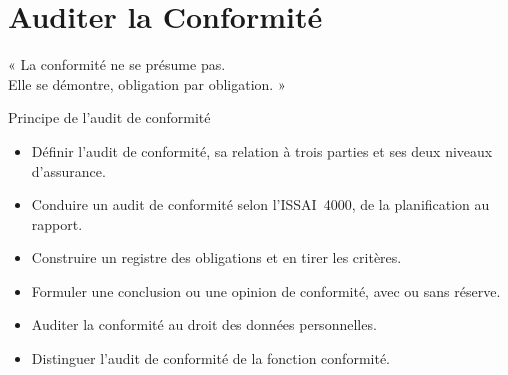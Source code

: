
\chapter{Auditer la Conformité}
\label{chap:audit-conformite}

\epigraph{%
    « La conformité ne se présume pas.\\
    Elle se démontre, obligation par obligation. »%
}{Principe de l'audit de conformité}


\begin{boxobjectifs}
\begin{itemize}
    \item Définir l'audit de conformité, sa relation à trois parties et ses
          deux niveaux d'assurance.
    \item Conduire un audit de conformité selon l'ISSAI~4000, de la
          planification au rapport.
    \item Construire un registre des obligations et en tirer les critères.
    \item Formuler une conclusion ou une opinion de conformité, avec ou sans
          réserve.
    \item Auditer la conformité au droit des données personnelles.
    \item Distinguer l'audit de conformité de la fonction conformité.
\end{itemize}
\end{boxobjectifs}

